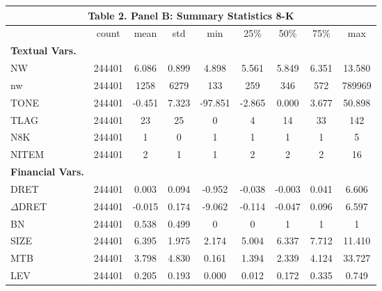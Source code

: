 \begin{table}[htbp] \label{T2PB}
  \centering
    \begin{tabular}{lcccccccc}
    \multicolumn{9}{c}{\textbf{Table 2. Panel B: Summary Statistics 8-K}} \\
    \midrule
      & count & mean & std & min & 25\% & 50\% & 75\% & max \\
    \midrule
    \textbf{Textual Vars.} &   &   &   &   &   &   &   &  \\
    NW & 244401 & 6.086 & 0.899 & 4.898 & 5.561 & 5.849 & 6.351 & 13.580 \\
    nw & 244401 & 1258 & 6279 & 133 & 259 & 346 & 572 & 789969 \\
    TONE & 244401 & -0.451 & 7.323 & -97.851 & -2.865 & 0.000 & 3.677 & 50.898 \\
    TLAG & 244401 & 23 & 25 & 0 & 4 & 14 & 33 & 142 \\
    N8K & 244401 & 1 & 0 & 1 & 1 & 1 & 1 & 5 \\
    NITEM & 244401 & 2 & 1 & 1 & 2 & 2 & 2 & 16 \\
    \textbf{Financial Vars.} &   &   &   &   &   &   &   &  \\
    DRET & 244401 & 0.003 & 0.094 & -0.952 & -0.038 & -0.003 & 0.041 & 6.606 \\
    $\Delta$DRET & 244401 & -0.015 & 0.174 & -9.062 & -0.114 & -0.047 & 0.096 & 6.597 \\
    BN & 244401 & 0.538 & 0.499 & 0 & 0 & 1 & 1 & 1 \\
    SIZE & 244401 & 6.395 & 1.975 & 2.174 & 5.004 & 6.337 & 7.712 & 11.410 \\
    MTB & 244401 & 3.798 & 4.830 & 0.161 & 1.394 & 2.339 & 4.124 & 33.727 \\
    LEV & 244401 & 0.205 & 0.193 & 0.000 & 0.012 & 0.172 & 0.335 & 0.749 \\
    \bottomrule
    \end{tabular}%
\end{table}%
